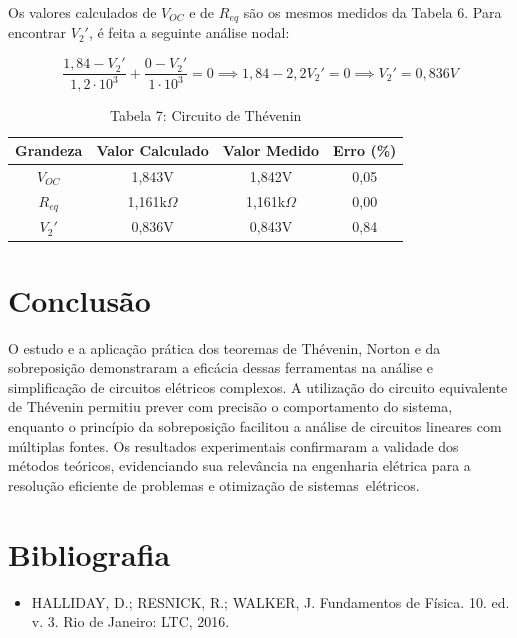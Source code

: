 \documentclass[a4 paper]{article}
\newcommand{\parag}{\hspace{30pt}}
\begin{document}
Os valores calculados de $V_{OC}$ e de $R_{eq}$ são os mesmos medidos da Tabela 6. Para encontrar $V_2'$, é feita a seguinte análise nodal:

\[
\frac{1,84-V_2'}{1,2\cdot10^3} + \frac{0-V_2'}{1\cdot10^3}=0 \implies 1,84-2,2V_2'=0 \implies V_2'=0,836V
\] 

\vspace{5pt}
\begin{table}[h]
\centering
\begin{tabular}{|c|c|c|c|}
\hline
 Grandeza & Valor Calculado & Valor Medido & Erro (\%) \\\hline
$V_{OC}$ & 1,843V & 1,842V &0,05 \\\hline
$R_{eq}$ & 1,161k$\Omega$ &  1,161k$\Omega$ & 0,00\\\hline
$V_2'$ & 0,836V & 0,843V &0,84 \\\hline
\end{tabular}
\caption*{Tabela 7: Circuito de Thévenin}
\end{table}

\newpage
\section{Conclusão}

\parag O estudo e a aplicação prática dos teoremas de Thévenin, Norton e da sobreposição demonstraram a eficácia dessas ferramentas na análise e simplificação de circuitos elétricos complexos. A utilização do circuito equivalente de Thévenin permitiu prever com precisão o comportamento do sistema, enquanto o princípio da sobreposição facilitou a análise de circuitos lineares com múltiplas fontes. Os resultados experimentais confirmaram a validade dos métodos teóricos, evidenciando sua relevância na engenharia elétrica para a resolução eficiente de problemas e otimização de sistemas elétricos.

\vspace{80pt}
\section{Bibliografia}
\begin{itemize}
\item HALLIDAY, D.; RESNICK, R.; WALKER, J. Fundamentos de Física. 10. ed. v. 3. Rio de Janeiro: LTC, 2016.
\end{itemize}
\end{document}
